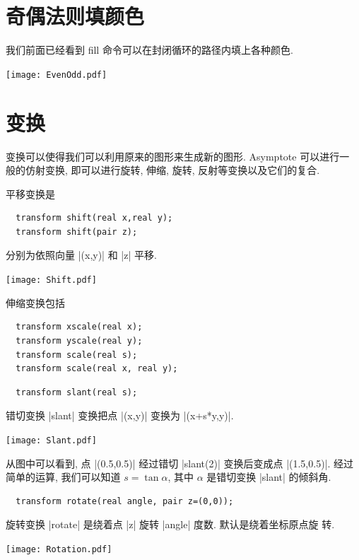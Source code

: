 \documentclass{ctexbook}
\begin{document}
\section{奇偶法则填颜色}

我们前面已经看到 {fill} 命令可以在封闭循环的路径内填上各种颜色.
\begin{center}\texttt{[image: EvenOdd.pdf]}\end{center}%

\section{变换}
变换可以使得我们可以利用原来的图形来生成新的图形. Asymptote 可以进行一
般的仿射变换, 即可以进行旋转, 伸缩, 旋转, 反射等变换以及它们的复合.

平移变换是
\begin{lstlisting}
  transform shift(real x,real y);
  transform shift(pair z);
\end{lstlisting}
分别为依照向量 |(x,y)| 和 |z| 平移.

\begin{center}\texttt{[image: Shift.pdf]}\end{center}%


伸缩变换包括
\begin{lstlisting}
  transform xscale(real x);
  transform yscale(real y);
  transform scale(real s);
  transform scale(real x, real y);
\end{lstlisting}

\begin{lstlisting}
  transform slant(real s);
\end{lstlisting}

错切变换 |slant| 变换把点 |(x,y)| 变换为 |(x+s*y,y)|.
\begin{center}\texttt{[image: Slant.pdf]}\end{center}%

从图中可以看到, 点 |(0.5,0.5)| 经过错切 |slant(2)| 变换后变成点
|(1.5,0.5)|. 经过简单的运算, 我们可以知道 $s=\tan\alpha$, 其中
$\alpha$ 是错切变换 |slant| 的倾斜角.

\begin{lstlisting}
  transform rotate(real angle, pair z=(0,0));
\end{lstlisting}
旋转变换 |rotate| 是绕着点 |z| 旋转 |angle| 度数. 默认是绕着坐标原点旋
转.
\begin{center}\texttt{[image: Rotation.pdf]}\end{center}%

\end{document}
